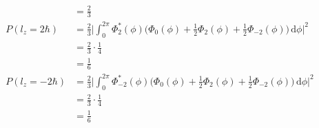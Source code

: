 \documentclass[../principles-of-quantum-mechanics.tex]{subfiles}
\begin{document}
\begin{questions}
\begin{solution}
\begin{align*}
			&= \frac{2}{3} \\
			P(l_z = 2\hbar) &= \frac{2}{3}\Big|\int_0^{2\pi}\Phi_2^*(\phi)\Big(\Phi_0(\phi) + \frac{1}{2}\Phi_2(\phi) + \frac{1}{2}\Phi_{-2}(\phi)\Big)\,\mathrm{d}\phi\Big|^2 \\
			&= \frac{2}{3}\cdot\frac{1}{4} \\
			&= \frac{1}{6} \\
			P(l_z = -2\hbar) &= \frac{2}{3}\Big|\int_0^{2\pi}\Phi_{-2}^*(\phi)\Big(\Phi_0(\phi) + \frac{1}{2}\Phi_2(\phi) + \frac{1}{2}\Phi_{-2}(\phi)\Big)\,\mathrm{d}\phi\Big|^2 \\
			&= \frac{2}{3}\cdot\frac{1}{4} \\
			&= \frac{1}{6}
		\end{align*}
	\end{solution}
	

\end{questions}
\end{document}
